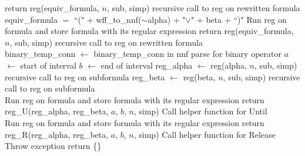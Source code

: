 \documentclass[runningheads]{llncs}
\begin{document}
\begin{algorithm}[H]
\begin{algorithmic}
            \State return reg(equiv\_formula, $n$, sub, simp)
            \Comment recursive call to reg on rewritten formula
        \EndIf\\
            \State equiv\_formula $=$ ``(" + wff\_to\_nnf($\scriptstyle{\sim}$alpha) + "$\lor$" + beta + ``)"
                \State Run reg on formula and store formula with its regular expression
            \EndIf
            \State return reg(equiv\_formula, $n$, sub, simp)
            \Comment recursive call to reg on rewritten formula
        \EndIf
    \EndIf\\
        \State binary\_temp\_conn $\leftarrow$ binary\_temp\_conn in nnf
        \Comment parse for binary operator
        \State $a$ $\leftarrow$ start of interval
        \State $b$ $\leftarrow$ end of interval
        \State reg\_alpha $\leftarrow$ reg(alpha, $n$, sub, simp)
        \Comment recursive call to reg on subformula
        \State reg\_beta $\leftarrow$ reg(beta, $n$, sub, simp)
        \Comment recursive call to reg on subformula
        \\
                \State Run reg on formula and store formula with its regular expression
            \EndIf
            \State return reg\_U(reg\_alpha, reg\_beta, $a$, $b$, $n$, simp)
            \Comment Call helper function for Until\\
                \State Run reg on formula and store formula with its regular expression
            \EndIf
            \State return reg\_R(reg\_alpha, reg\_beta, $a$, $b$, $n$, simp)
            \Comment Call helper function for Release
        \EndIf
    \EndIf\\
    \State Throw exception 
    \State return \{\}
\EndProcedure
\end{algorithmic}
\end{algorithm}
\end{document}

